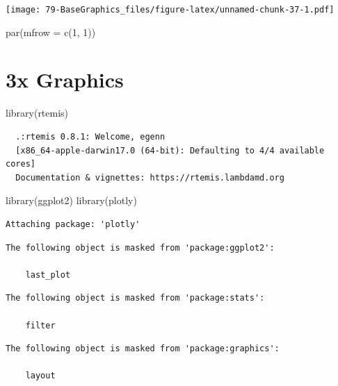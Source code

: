 \documentclass[
]{book}
\newenvironment{Shaded}{\begin{snugshade}}{\end{snugshade}}
\newcommand{\AttributeTok}[1]{\textcolor[rgb]{0.77,0.63,0.00}{#1}}
\newcommand{\DecValTok}[1]{\textcolor[rgb]{0.00,0.00,0.81}{#1}}
\newcommand{\FunctionTok}[1]{\textcolor[rgb]{0.00,0.00,0.00}{#1}}
\newcommand{\NormalTok}[1]{#1}
\begin{document}
\texttt{[image: 79-BaseGraphics\_files/figure-latex/unnamed-chunk-37-1.pdf]}

\begin{Shaded}
\begin{Highlighting}[]
\FunctionTok{par}\NormalTok{(}\AttributeTok{mfrow =} \FunctionTok{c}\NormalTok{(}\DecValTok{1}\NormalTok{, }\DecValTok{1}\NormalTok{))}
\end{Highlighting}
\end{Shaded}

\hypertarget{graphics3x}{%
\chapter{3x Graphics}\label{graphics3x}}

\begin{Shaded}
\begin{Highlighting}[]
\FunctionTok{library}\NormalTok{(rtemis)}
\end{Highlighting}
\end{Shaded}

\begin{verbatim}
  .:rtemis 0.8.1: Welcome, egenn
  [x86_64-apple-darwin17.0 (64-bit): Defaulting to 4/4 available cores]
  Documentation & vignettes: https://rtemis.lambdamd.org
\end{verbatim}

\begin{Shaded}
\begin{Highlighting}[]
\FunctionTok{library}\NormalTok{(ggplot2)}
\FunctionTok{library}\NormalTok{(plotly)}
\end{Highlighting}
\end{Shaded}

\begin{verbatim}
Attaching package: 'plotly'
\end{verbatim}

\begin{verbatim}
The following object is masked from 'package:ggplot2':

    last_plot
\end{verbatim}

\begin{verbatim}
The following object is masked from 'package:stats':

    filter
\end{verbatim}

\begin{verbatim}
The following object is masked from 'package:graphics':

    layout
\end{verbatim}
\end{document}
